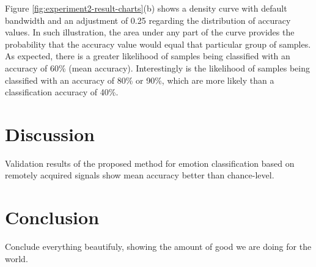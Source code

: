 Figure \ref{fig:experiment2-result-charts}(b) shows a density curve with default bandwidth and an adjustment of 0.25 regarding the distribution of accuracy values. In such illustration, the area under any part of the curve provides the probability that the accuracy value would equal that particular group of samples. As expected, there is a greater likelihood of samples being classified with an accuracy of 60\% (mean accuracy). Interestingly is the likelihood of samples being classified with an accuracy of 80\% or 90\%, which are more likely than a classification accuracy of 40\%.


\section{Discussion}

Validation results of the proposed method for emotion classification based on remotely acquired signals show mean accuracy better than chance-level.



\section{Conclusion}

Conclude everything beautifuly, showing the amount of good we are doing for the world.

